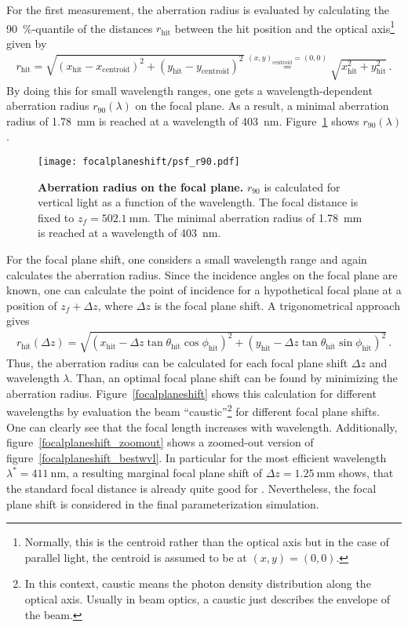 For the first measurement, the aberration radius is evaluated by calculating the \SI{90}{\percent}-quantile of the distances $r_\text{hit}$ between the hit position and the optical axis\footnote{Normally, this is the centroid rather than the optical axis but in the case of parallel light, the centroid is assumed to be at $(x,y) = (0,0)$.} given by
\begin{align}
	r_\text{hit} = \sqrt{\left(x_\text{hit}-x_\text{centroid}\right)^2+\left(y_\text{hit}-y_\text{centroid}\right)^2} \overset{(x,y)_\text{centroid}=(0,0)}{=}\sqrt{x_\text{hit}^2+y_\text{hit}^2}\,.
\end{align}
By doing this for small wavelength ranges, one gets a wavelength-dependent aberration radius $r_{90}(\lambda)$ on the focal plane. As a result, a minimal aberration radius of \SI{1.78}{\milli\meter} is reached at a wavelength of \SI{403}{\nano\meter}. Figure~\ref{psf_at_focal_plane} shows $r_{90}(\lambda)$.\\

\begin{figure}[H]
	\centering
	\texttt{[image: focalplaneshift/psf\_r90.pdf]}
	\caption[Aberration radius on the focal plane]{\textbf{Aberration radius on the focal plane.} $r_{90}$ is calculated for vertical light as a function of the wavelength. The focal distance is fixed to $z_f=\SI{502.1}{\milli\meter}$. The minimal aberration radius of \SI{1.78}{\milli\meter} is reached at a wavelength of \SI{403}{\nano\meter}.}
	\label{psf_at_focal_plane}
\end{figure}

For the focal plane shift, one considers a small wavelength range and again calculates the aberration radius. Since the incidence angles on the focal plane are known, one can calculate the point of incidence for a hypothetical focal plane at a position of $z_f+\Delta z$, where $\Delta z$ is the focal plane shift. A trigonometrical approach gives
\begin{align}
	r_\text{hit}(\Delta z) = \sqrt{\left(x_\text{hit}-\Delta z\tan\theta_\text{hit}\cos\phi_\text{hit}\right)^2 + \left(y_\text{hit}-\Delta z\tan\theta_\text{hit}\sin\phi_\text{hit}\right)^2}\,.
\end{align}
Thus, the aberration radius can be calculated for each focal plane shift $\Delta z$ and wavelength $\lambda$. Than, an optimal focal plane shift can be found by minimizing the aberration radius. Figure~\ref{focalplaneshift} shows this calculation for different wavelengths by evaluation the beam \enquote{caustic}\footnote{In this context, caustic means the photon density distribution along the optical axis. Usually in beam optics, a caustic just describes the envelope of the beam.} for different focal plane shifts. One can clearly see that the focal length increases with wavelength. Additionally, figure~\ref{focalplaneshift_zoomout} shows a zoomed-out version of figure~\ref{focalplaneshift_bestwvl}. In particular for the most efficient wavelength $\lambda^\ast=\SI{411}{\nano\meter}$, a resulting marginal focal plane shift of $\Delta z=\SI{1.25}{\milli\meter}$ shows, that the standard focal distance is already quite good for \iceact. Nevertheless, the focal plane shift is considered in the final parameterization simulation.

